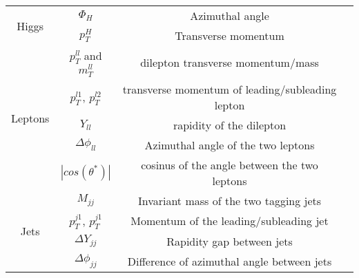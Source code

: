 \begin{table}[]
\begin{tabular}{clll}
\cline{1-3}
\multicolumn{1}{|c|}{\multirow{2}{*}{Higgs}}        & \multicolumn{1}{c|}{$\Phi_{H}$}                     & \multicolumn{1}{c|}{Azimuthal angle}                                  &  \\ \cline{2-3}
\multicolumn{1}{|c|}{}                              & \multicolumn{1}{c|}{$p_{T}^{H}$}                    & \multicolumn{1}{c|}{Transverse momentum}                              &  \\ \cline{1-3}
\multicolumn{1}{|c|}{\multirow{5}{*}{Leptons}}      & \multicolumn{1}{c|}{$p_{T}^{ll}$ and $m_{T}^{ll}$}  & \multicolumn{1}{c|}{dilepton transverse momentum/mass}                &  \\ \cline{2-3}
\multicolumn{1}{|c|}{}                              & \multicolumn{1}{c|}{$p_{T}^{l1}$, $p_{T}^{l2}$}     & \multicolumn{1}{c|}{transverse momentum of leading/subleading lepton} &  \\ \cline{2-3}
\multicolumn{1}{|c|}{}                              & \multicolumn{1}{c|}{$Y_{ll}$}                       & \multicolumn{1}{c|}{rapidity of the dilepton}                         &  \\ \cline{2-3}
\multicolumn{1}{|c|}{}                              & \multicolumn{1}{c|}{$\Delta \phi_{ll}$}             & \multicolumn{1}{c|}{Azimuthal angle of the two leptons}               &  \\ \cline{2-3}
\multicolumn{1}{|c|}{}                              & \multicolumn{1}{c|}{$|cos(\theta ^{*})|$}           & \multicolumn{1}{c|}{cosinus of the angle between the two leptons}     &  \\ \cline{1-3}
\multicolumn{1}{|c|}{\multirow{4}{*}{Jets}}         & \multicolumn{1}{c|}{$M_{jj}$}                       & \multicolumn{1}{c|}{Invariant mass of the two tagging jets}           &  \\ \cline{2-3}
\multicolumn{1}{|c|}{}                              & \multicolumn{1}{c|}{$p_{T}^{j1}$, $p_{T}^{j1}$}     & \multicolumn{1}{c|}{Momentum of the leading/subleading jet}           &  \\ \cline{2-3}
\multicolumn{1}{|c|}{}                              & \multicolumn{1}{c|}{$\Delta Y_{jj}$}                & \multicolumn{1}{c|}{Rapidity gap between jets}                        &  \\ \cline{2-3}
\multicolumn{1}{|c|}{}                              & \multicolumn{1}{c|}{$\Delta \phi_{jj}$}             & \multicolumn{1}{c|}{Difference of azimuthal angle between jets}       &  \\ \cline{1-3}

\end{tabular}
\end{table}
